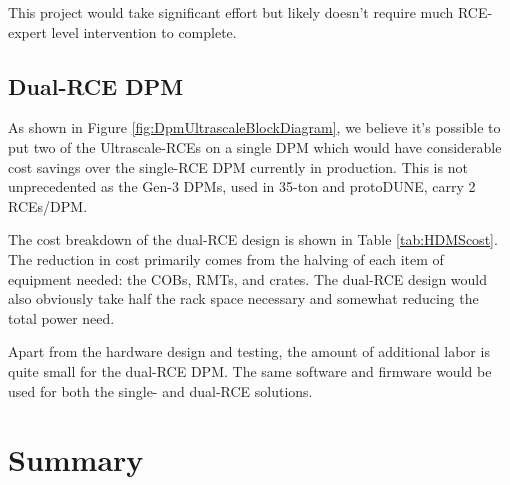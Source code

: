  This project would take significant effort but likely doesn't require much RCE-expert level intervention to complete.  

\subsection{Dual-RCE DPM}
\label{sec:dualRCE}
As shown in Figure \ref{fig:DpmUltrascaleBlockDiagram},  we believe it's possible to put two of the Ultrascale-RCEs on a single DPM which would have considerable cost savings over the single-RCE DPM currently in production.  This is not unprecedented as the Gen-3 DPMs, used in 35-ton and protoDUNE, carry 2 RCEs/DPM.  


The cost breakdown of the dual-RCE design is shown in Table \ref{tab:HDMScost}.  The reduction in cost primarily comes from the halving of each item of equipment needed: the COBs, RMTs, and crates.  The dual-RCE design would also obviously take half the rack space necessary and somewhat reducing the total power need. 

Apart from the hardware design and testing, the amount of additional labor is quite small for the dual-RCE DPM.  The same software and firmware would be used for both the single- and dual-RCE solutions.  

\section{Summary}






